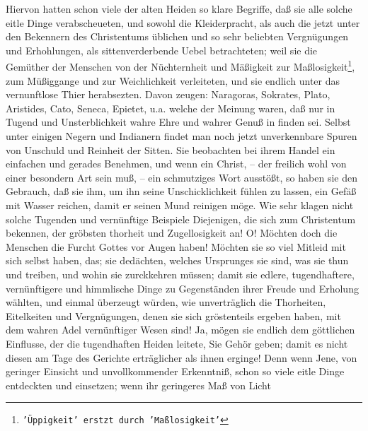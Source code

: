 Hiervon hatten schon viele der alten Heiden so klare Begriffe, daß sie alle
solche eitle Dinge verabscheueten, und sowohl die Kleiderpracht, als auch die
jetzt unter den Bekennern des Christentums üblichen und so sehr beliebten
Vergnügungen und Erhohlungen, als sittenverderbende Uebel betrachteten; weil sie
die Gemüther der Menschen von der Nüchternheit und Mäßigkeit zur Maßlosigkeit\footnote{\texttt{'Üppigkeit' erstzt durch 'Maßlosigkeit'}}, zum
Müßiggange und zur Weichlichkeit verleiteten, und sie endlich unter das
vernunftlose Thier herabsezten. Davon zeugen: Naragoras, Sokrates, Plato,
Aristides, Cato, Seneca, Epietet, u.a. welche der Meinung waren, daß nur in
Tugend und Unsterblichkeit wahre Ehre und wahrer Genuß in finden sei. Selbst
unter einigen Negern und Indianern findet man noch jetzt unverkennbare Spuren
von Unschuld und Reinheit der Sitten. Sie beobachten bei ihrem Handel ein
einfachen und gerades Benehmen, und wenn ein Christ, -- der freilich wohl von
einer besondern Art sein muß, -- ein schmutziges Wort ausstößt, so haben sie den
Gebrauch, daß sie ihm, um ihn seine Unschicklichkeit fühlen zu lassen, ein
Gefäß mit Wasser reichen, damit er seinen Mund reinigen möge. Wie sehr klagen
nicht solche Tugenden und vernünftige Beispiele Diejenigen, die sich zum
Christentum bekennen, der gröbsten thorheit und Zugellosigkeit an! O! Möchten
doch die Menschen die Furcht Gottes vor Augen haben! Möchten sie so viel Mitleid
mit sich selbst haben, das; sie dedächten, welches Ursprunges sie sind, was sie
thun und treiben, und wohin sie zurckkehren müssen; damit sie edlere,
tugendhaftere, vernünftigere und himmlische Dinge zu Gegenständen ihrer Freude
und Erholung wählten, und einmal überzeugt würden, wie unverträglich die
Thorheiten, Eitelkeiten und Vergnügungen, denen sie sich gröstenteils ergeben
haben, mit dem wahren Adel vernünftiger Wesen sind! Ja, mögen sie endlich dem
göttlichen Einflusse, der die tugendhaften Heiden leitete, Sie Gehör geben;
damit es nicht diesen am Tage des Gerichte erträglicher als ihnen erginge! Denn
wenn Jene, von geringer Einsicht und unvollkommender Erkenntniß, schon so viele
eitle Dinge entdeckten und einsetzen; wenn ihr geringeres Maß von Licht
